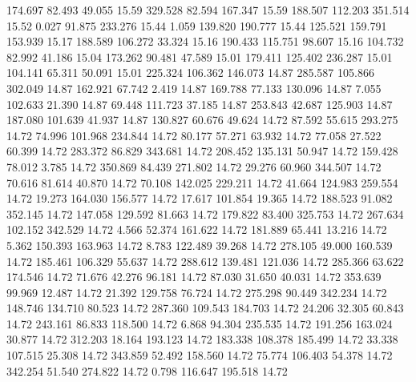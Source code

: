  174.697   82.493   49.055        15.59
 329.528   82.594  167.347        15.59
 188.507  112.203  351.514        15.52
   0.027   91.875  233.276        15.44
   1.059  139.820  190.777        15.44
 125.521  159.791  153.939        15.17
 188.589  106.272   33.324        15.16
 190.433  115.751   98.607        15.16
 104.732   82.992   41.186        15.04
 173.262   90.481   47.589        15.01
 179.411  125.402  236.287        15.01
 104.141   65.311   50.091        15.01
 225.324  106.362  146.073        14.87
 285.587  105.866  302.049        14.87
 162.921   67.742    2.419        14.87
 169.788   77.133  130.096        14.87
   7.055  102.633   21.390        14.87
  69.448  111.723   37.185        14.87
 253.843   42.687  125.903        14.87
 187.080  101.639   41.937        14.87
 130.827   60.676   49.624        14.72
  87.592   55.615  293.275        14.72
  74.996  101.968  234.844        14.72
  80.177   57.271   63.932        14.72
  77.058   27.522   60.399        14.72
 283.372   86.829  343.681        14.72
 208.452  135.131   50.947        14.72
 159.428   78.012    3.785        14.72
 350.869   84.439  271.802        14.72
  29.276   60.960  344.507        14.72
  70.616   81.614   40.870        14.72
  70.108  142.025  229.211        14.72
  41.664  124.983  259.554        14.72
  19.273  164.030  156.577        14.72
  17.617  101.854   19.365        14.72
 188.523   91.082  352.145        14.72
 147.058  129.592   81.663        14.72
 179.822   83.400  325.753        14.72
 267.634  102.152  342.529        14.72
   4.566   52.374  161.622        14.72
 181.889   65.441   13.216        14.72
   5.362  150.393  163.963        14.72
   8.783  122.489   39.268        14.72
 278.105   49.000  160.539        14.72
 185.461  106.329   55.637        14.72
 288.612  139.481  121.036        14.72
 285.366   63.622  174.546        14.72
  71.676   42.276   96.181        14.72
  87.030   31.650   40.031        14.72
 353.639   99.969   12.487        14.72
  21.392  129.758   76.724        14.72
 275.298   90.449  342.234        14.72
 148.746  134.710   80.523        14.72
 287.360  109.543  184.703        14.72
  24.206   32.305   60.843        14.72
 243.161   86.833  118.500        14.72
   6.868   94.304  235.535        14.72
 191.256  163.024   30.877        14.72
 312.203   18.164  193.123        14.72
 183.338  108.378  185.499        14.72
  33.338  107.515   25.308        14.72
 343.859   52.492  158.560        14.72
  75.774  106.403   54.378        14.72
 342.254   51.540  274.822        14.72
   0.798  116.647  195.518        14.72
